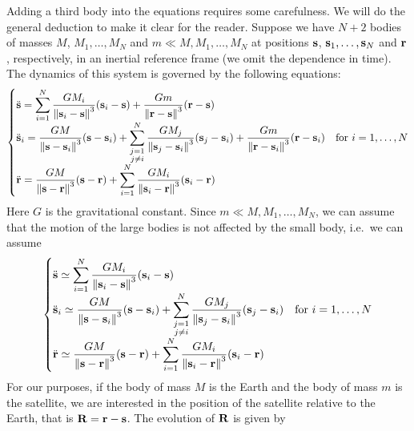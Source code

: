 \documentclass[../main.tex]{subfiles}
\begin{document}
Adding a third body into the equations requires some carefulness. We will do the general deduction to make it clear for the reader. Suppose we have $N+2$ bodies of masses $M$, $M_1,\ldots, M_N$ and $m\ll M,M_1,\ldots,M_N$ at positions $\vf{s}$, $\vf{s}_1,\ldots,\vf{s}_N$ and $\vf{r}$, respectively, in an inertial reference frame (we omit the dependence in time). The dynamics of this system is governed by the following equations:
\begin{equation}
  \begin{cases}
    \displaystyle \ddot{\vf{s}}=\sum_{i=1}^N\frac{GM_i}{\norm{\vf{s}_i-\vf{s}}^3}(\vf{s}_i-\vf{s})      +\frac{Gm}{\norm{\vf{r}-\vf{s}}^3}(\vf{r}-\vf{s}) \\
    \displaystyle \ddot{\vf{s}}_i=\frac{GM}{\norm{\vf{s}-\vf{s}_i}^3}(\vf{s}-\vf{s}_i)+\sum_{\substack{j=1                                                \\j\ne i}}^N\frac{GM_j}{\norm{\vf{s}_j-\vf{s}_i}^3}(\vf{s}_j-\vf{s}_i)+\frac{Gm}{\norm{\vf{r}-\vf{s}_i}^3}(\vf{r}-\vf{s}_i)& \text{for } i=1,\ldots, N \\
    \displaystyle \ddot{\vf{r}}=\frac{GM}{\norm{\vf{s}-\vf{r}}^3}(\vf{s}-\vf{r})+\sum_{i=1}^N\frac{GM_i}{\norm{\vf{s}_i-\vf{r}}^3}(\vf{s}_i-\vf{r})
  \end{cases}
\end{equation}
Here $G$ is the gravitational constant. Since $m\ll M,M_1,\ldots,M_N$, we can assume that the motion of the large bodies is not affected by the small body, i.e.\ we can assume
\begin{equation}
  \begin{cases}
    \displaystyle \ddot{\vf{s}}\simeq \sum_{i=1}^N\frac{GM_i}{\norm{\vf{s}_i-\vf{s}}^3}(\vf{s}_i-\vf{s})        \\
    \displaystyle \ddot{\vf{s}}_i\simeq\frac{GM}{\norm{\vf{s}-\vf{s}_i}^3}(\vf{s}-\vf{s}_i)+\sum_{\substack{j=1 \\j\ne i}}^N\frac{GM_j}{\norm{\vf{s}_j-\vf{s}_i}^3}(\vf{s}_j-\vf{s}_i)& \text{for } i=1,\ldots, N \\
    \displaystyle \ddot{\vf{r}}\simeq\frac{GM}{\norm{\vf{s}-\vf{r}}^3}(\vf{s}-\vf{r})+\sum_{i=1}^N\frac{GM_i}{\norm{\vf{s}_i-\vf{r}}^3}(\vf{s}_i-\vf{r})
  \end{cases}
\end{equation}
For our purposes, if the body of mass $M$ is the Earth and the body of mass $m$ is the satellite, we are interested in the position of the satellite relative to the Earth, that is $\vf{R}=\vf{r}-\vf{s}$. The evolution of $\vf{R}$ is given by
\end{document}
